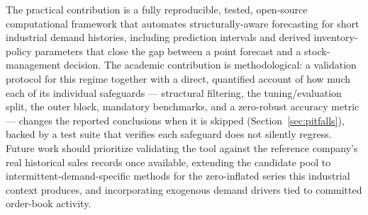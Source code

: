 \documentclass[forecasting,article,submit,pdftex,moreauthors]{Definitions/mdpi}
\begin{document}
The practical contribution is a fully reproducible, tested, open-source computational framework that automates structurally-aware forecasting for short industrial demand histories, including prediction intervals and derived inventory-policy parameters that close the gap between a point forecast and a stock-management decision. The academic contribution is methodological: a validation protocol for this regime together with a direct, quantified account of how much each of its individual safeguards --- structural filtering, the tuning/evaluation split, the outer block, mandatory benchmarks, and a zero-robust accuracy metric --- changes the reported conclusions when it is skipped (Section~\ref{sec:pitfalls}), backed by a test suite that verifies each safeguard does not silently regress. Future work should prioritize validating the tool against the reference company's real historical sales records once available, extending the candidate pool to intermittent-demand-specific methods for the zero-inflated series this industrial context produces, and incorporating exogenous demand drivers tied to committed order-book activity.

\vspace{6pt} 




\end{document}
